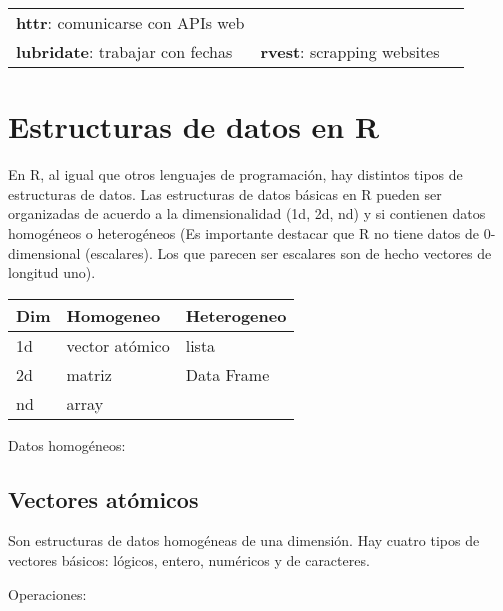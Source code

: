 \documentclass[]{book}
\begin{document}
\begin{longtable}[]{@{}lll@{}}
\begin{minipage}[t]{0.30\columnwidth}
\textbf{httr}: comunicarse con APIs web\strut
\end{minipage} & \begin{minipage}[t]{0.30\columnwidth}\raggedright
\strut
\end{minipage}\tabularnewline
\begin{minipage}[t]{0.30\columnwidth}\raggedright
\textbf{lubridate}: trabajar con fechas\strut
\end{minipage} & \begin{minipage}[t]{0.30\columnwidth}\raggedright
\textbf{rvest}: scrapping websites\strut
\end{minipage} & \begin{minipage}[t]{0.30\columnwidth}\raggedright
\strut
\end{minipage}\tabularnewline
\bottomrule
\end{longtable}

\hypertarget{estructuras-de-datos-en-r}{%
\section{Estructuras de datos en R}\label{estructuras-de-datos-en-r}}

En R, al igual que otros lenguajes de programación, hay distintos tipos de estructuras de datos. Las estructuras de datos básicas en R pueden ser organizadas de acuerdo a la dimensionalidad (1d, 2d, nd) y si contienen datos homogéneos o heterogéneos (Es importante destacar que R no tiene datos de 0-dimensional (escalares). Los que parecen ser escalares son de hecho vectores de longitud uno).

\begin{longtable}[]{@{}lll@{}}
\toprule
Dim & Homogeneo & Heterogeneo\tabularnewline
\midrule
\endhead
1d & vector atómico & lista\tabularnewline
2d & matriz & Data Frame\tabularnewline
nd & array &\tabularnewline
\bottomrule
\end{longtable}

Datos homogéneos:

\hypertarget{vectores-atuxf3micos}{%
\subsection{Vectores atómicos}\label{vectores-atuxf3micos}}

Son estructuras de datos homogéneas de una dimensión. Hay cuatro tipos de vectores básicos: lógicos, entero, numéricos y de caracteres.

Operaciones:
\end{document}
